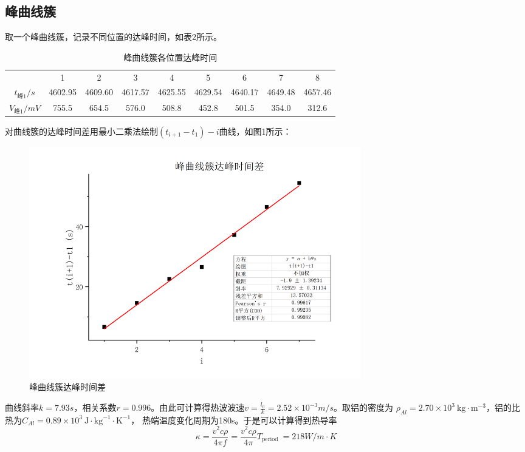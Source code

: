 \documentclass{article}
\begin{document}
    \subsection{峰曲线簇}
    取一个峰曲线簇，记录不同位置的达峰时间，如表2所示。
    \begin{table}[h]
        \centering
        \caption{峰曲线簇各位置达峰时间}
        \vspace{1ex}
        \begin{tabular}{ccccccccc}
            \hline
                  & 1     & 2     & 3     & 4     & 5     & 6     & 7     & 8 \bigstrut[t]\\
            $t_{\text{峰}1}/s$ & 4602.95 & 4609.60 & 4617.57 & 4625.55 & 4629.54 & 4640.17 & 4649.48 & 4657.46 \\
            $V_{\text{峰}1}/mV$ & 755.5 & 654.5 & 576.0   & 508.8 & 452.8 & 501.5 & 354.0   & 312.6 \bigstrut[b]\\
            \hline
        \end{tabular}%
    \end{table}

    对曲线簇的达峰时间差用最小二乘法绘制$\left(t_{i+1}-t_{1}\right)-i$曲线，如图1所示：

    \begin{figure}[h]
        \centering
        \includegraphics[width=0.7\textwidth]{峰.jpg}
        \caption{峰曲线簇达峰时间差}
    \end{figure}

    曲线斜率$k=7.93s$，相关系数$r=0.996$。由此可计算得热波波速$v=\frac{l_0}{k}=2.52\times 10^{-3}m/s$。取铝的密度为
    $\rho_{A l}=2.70 \times 10^{3} \mathrm{~kg} \cdot \mathrm{m}^{-3}$，铝的比热为$C_{A l}=0.89 \times 10^{3} \mathrm{~J} \cdot \mathrm{kg}^{-1} \cdot \mathrm{K}^{-1}$，
    热端温度变化周期为180s。于是可以计算得到热导率
    $$\kappa=\frac{v^{2} c \rho}{4 \pi f}=\frac{v^{2} c \rho}{4 \pi} T_{\text {period }}=218W/m\cdot K$$
\end{document}
